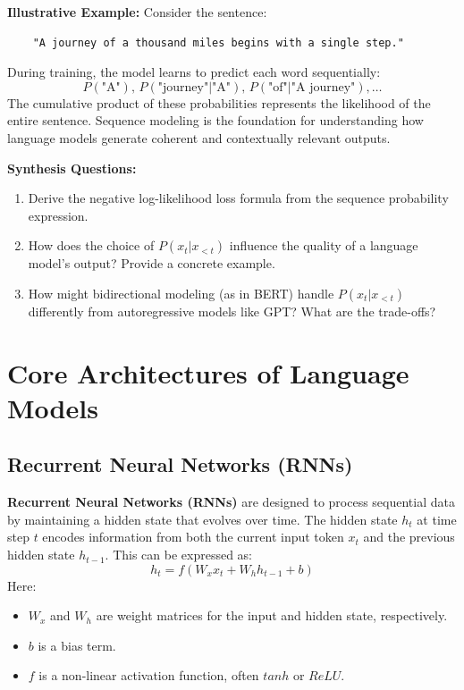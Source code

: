     \textbf{Illustrative Example:}
    Consider the sentence:
    \begin{verbatim}
    "A journey of a thousand miles begins with a single step."
    \end{verbatim}
    During training, the model learns to predict each word sequentially:
    \[
    P(\text{"A"}), \, P(\text{"journey"} | \text{"A"}), \, P(\text{"of"} | \text{"A journey"}), \dots
    \]
    The cumulative product of these probabilities represents the likelihood of the entire sentence. Sequence modeling is the foundation for understanding how language models generate coherent and contextually relevant outputs.

\begin{questionbox}
\textbf{Synthesis Questions:}
\begin{enumerate}
    \item Derive the negative log-likelihood loss formula from the sequence probability expression.
    \item How does the choice of \( P(x_t | x_{<t}) \) influence the quality of a language model's output? Provide a concrete example.
    \item How might bidirectional modeling (as in BERT) handle \( P(x_t | x_{<t}) \) differently from autoregressive models like GPT? What are the trade-offs? 
\end{enumerate}
\end{questionbox}


\section{Core Architectures of Language Models}

\subsection{Recurrent Neural Networks (RNNs)}

    \large \textbf{Recurrent Neural Networks (RNNs)} are designed to process sequential data by maintaining a hidden state that evolves over time. The hidden state \(h_t\) at time step \(t\) encodes information from both the current input token \(x_t\) and the previous hidden state \(h_{t-1}\). This can be expressed as:
    \[
    h_t = f(W_x x_t + W_h h_{t-1} + b)
    \]
    Here:
    \begin{itemize}
        \item \(W_x\) and \(W_h\) are weight matrices for the input and hidden state, respectively.
        \item \(b\) is a bias term.
        \item \(f\) is a non-linear activation function, often \(tanh\) or \(ReLU\).
    \end{itemize}

